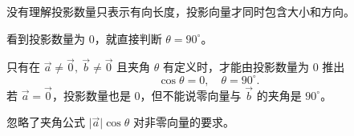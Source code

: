 \begin{trapbox}
\begin{description}[style=nextline, leftmargin=2.8em, labelsep=0.5em, itemsep=0.35em]
		\item[\textbf{\textcolor{CTrap}{错因分析（几何意义不清）：}}] 没有理解投影数量只表示有向长度，投影向量才同时包含大小和方向。
	\end{description}

	\medskip

	\begin{description}[style=nextline, leftmargin=2.8em, labelsep=0.5em, itemsep=0.35em]
		\item[\textbf{\textcolor{CTrap}{易错点四（零向量夹角误判）}}] 看到投影数量为 $0$，就直接判断 $\theta=90^\circ$。

		\item[\textbf{\textcolor{CTrap}{正确理解（补充前提）：}}] 只有在 $\vec a\neq\vec 0,\ \vec b\neq\vec 0$ 且夹角 $\theta$ 有定义时，才能由投影数量为 $0$ 推出
		      \[
			      \cos\theta=0,
			      \quad
			      \theta=90^\circ.
		      \]
		      若 $\vec a=\vec 0$，投影数量也是 $0$，但不能说零向量与 $\vec b$ 的夹角是 $90^\circ$。

		\item[\textbf{\textcolor{CTrap}{错因分析（边界条件遗漏）：}}] 忽略了夹角公式 $\lvert\vec a\rvert\cos\theta$ 对非零向量的要求。
	\end{description}

\end{trapbox}